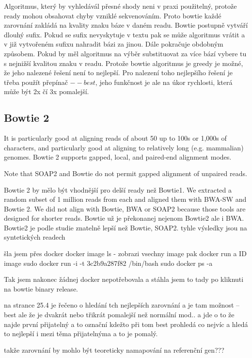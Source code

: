 \documentclass[czech,DP]{thesiskiv}
\numberwithin{equation}{section}
\begin{document}
\noindent
Algoritmus, který by vyhledávál přesné shody neni v praxi použitelný, protože ready mohou obsahovat chyby vzniklé sekvenováním. Proto bowtie každé zarovnání zakládá na kvality znaku báze v daném readu. Bowtie postupně vytváří dlouhý sufix. Pokud se sufix nevyskytuje v textu pak se může algoritmus vrátit a v již vytvořeném sufixu nahradit bázi za jinou. Dále pokračuje obdobným způsobem. Pokud by měl algoritmus na výběr substituovat za více bází vybere tu s nejnižší kvalitou znaku v readu. Protože bowtie algoritmus je greedy je možné, že jeho nalezené řešení není to nejlepší. Pro nalezení toho nejlepšího řešení je třeba použít přepínač $--best$, jeho funkčnost je ale na úkor rychlosti, která může být 2x čí 3x pomalejší. 


\subsection{Bowtie 2}
 It is particularly good at aligning reads of about 50 up to 100s or 1,000s of characters, and particularly good at aligning to relatively long (e.g. mammalian) genomes.
  Bowtie 2 supports gapped, local, and paired-end alignment modes.

Note that SOAP2 and Bowtie do not permit gapped alignment of unpaired reads.

 Bowtie 2 by mělo být vhodnější pro delší ready než Bowtie1.
 We extracted a random subset of 1 million reads from each and aligned them with BWA-SW and Bowtie 2. We did not align with Bowtie, BWA or SOAP2 because those tools are designed for shorter reads.
Bowtie už je překonanej nejenom Bowtie2 ale i BWA.
Bowtie2 je podle studie znatelně lepší než Bowtie, SOAP2.
tyhle výsledky jsou na syntetických readech


šla jsem přes docker docker image ls - zobrazi vsechny image pak docker run a ID image
sudo docker run -i -t 3c2b9a287f82 /bin/bash
sudo docker ps -a

Tak jsem nakonec žádnej docker nepotřebovala a stáhla jsem to tady %
 po kliknuti na bowtie binary release.

na strance 25.4 je řečeno o hledání tch nejlepších zarovnání a je tam možnost --best ale že je dvakrát nebo třikrát pomalejší než normální mod.. a jde o to že najde první přijatelný a to označní kdežto při tom best prohledá co nejvíc a hledá to nejlepší i mezi těma přijatelnýma a to je pomalý.

takže zarovnání by mohlo být teoreticky namapování na referenční gen???
\end{document}
